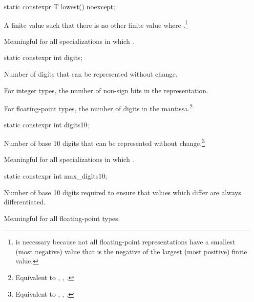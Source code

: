 %
\begin{itemdecl}
static constexpr T lowest() noexcept;
\end{itemdecl}

\begin{itemdescr}
\pnum
A finite value  such that there is no other finite
value  where .\footnote{ is necessary because not all
floating-point representations have a smallest (most negative) value that is
the negative of the largest (most positive) finite value.}

\pnum
Meaningful for all specializations in which .
\end{itemdescr}

%
\begin{itemdecl}
static constexpr int digits;
\end{itemdecl}

\begin{itemdescr}
\pnum
Number of
digits that can be represented without change.

\pnum
For integer types, the number of non-sign bits in the representation.

\pnum For floating-point types, the number of  digits in the
mantissa.\footnote{Equivalent to , ,
.} \end{itemdescr}

%
\begin{itemdecl}
static constexpr int digits10;
\end{itemdecl}

\begin{itemdescr}
\pnum
Number of base 10 digits that can be represented without
change.\footnote{Equivalent to , ,
.}

\pnum
Meaningful for all specializations in which
.
\end{itemdescr}

%
\begin{itemdecl}
static constexpr int max_digits10;
\end{itemdecl}

\begin{itemdescr}
\pnum
Number of base 10 digits required to ensure that values which
differ are always differentiated.

\pnum
Meaningful for all floating-point types.
\end{itemdescr}


